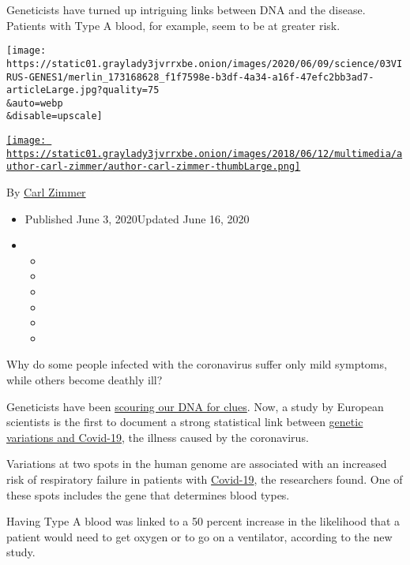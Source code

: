 Geneticists have turned up intriguing links between DNA and the disease.
Patients with Type A blood, for example, seem to be at greater risk.

\texttt{[image: https://static01.graylady3jvrrxbe.onion/images/2020/06/09/science/03VIRUS-GENES1/merlin\_173168628\_f1f7598e-b3df-4a34-a16f-47efc2bb3ad7-articleLarge.jpg?quality=75\\\&auto=webp\\\&disable=upscale]}

\href{https://www.nytimes3xbfgragh.onion/by/carl-zimmer}{\texttt{[image: https://static01.graylady3jvrrxbe.onion/images/2018/06/12/multimedia/author-carl-zimmer/author-carl-zimmer-thumbLarge.png]}}

By \href{https://www.nytimes3xbfgragh.onion/by/carl-zimmer}{Carl Zimmer}

\begin{itemize}
\item
  Published June 3, 2020Updated June 16, 2020
\item
  \begin{itemize}
  \item
  \item
  \item
  \item
  \item
  \item
  \end{itemize}
\end{itemize}

Why do some people infected with the coronavirus suffer only mild
symptoms, while others become deathly ill?

Geneticists have been
\href{https://www.nytimes3xbfgragh.onion/2020/07/04/health/coronavirus-neanderthals.html}{scouring
our DNA for clues}. Now, a study by European scientists is the first to
document a strong statistical link between
\href{https://www.medrxiv.org/content/10.1101/2020.05.31.20114991v1}{genetic
variations and Covid-19}, the illness caused by the coronavirus.

Variations at two spots in the human genome are associated with an
increased risk of respiratory failure in patients with
\href{https://www.nytimes3xbfgragh.onion/2020/06/15/health/coronavirus-underlying-conditions.html}{Covid-19},
the researchers found. One of these spots includes the gene that
determines blood types.

Having Type A blood was linked to a 50 percent increase in the
likelihood that a patient would need to get oxygen or to go on a
ventilator, according to the new study.

